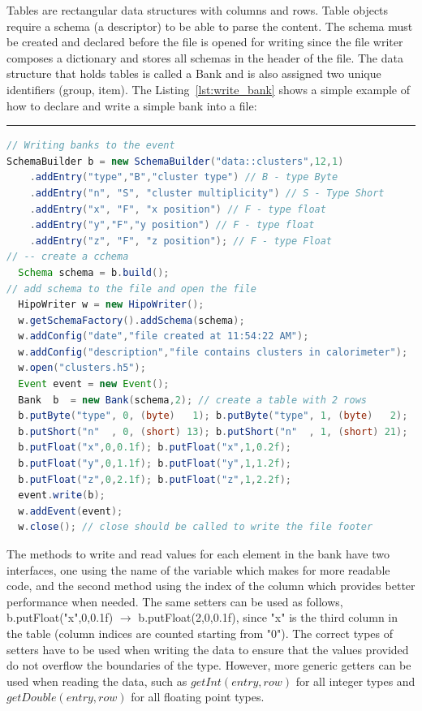 Tables are rectangular data structures with columns and rows. Table objects require a schema (a descriptor) to be able to parse the content. The schema must be created 
and declared before the file is opened for writing since the file writer composes a dictionary and stores all schemas in the header of the file. The data structure that holds
tables is called a Bank and is also assigned two unique identifiers (group, item). The Listing~\ref{lst:write_bank} shows a simple example of how to declare and write a 
simple bank into a file:
\rule{16.5cm}{0.4pt}
\begin{lstlisting}[language=java, caption=Java example to create and write banks (tables) into an event, label=lst:write_bank]
// Writing banks to the event
SchemaBuilder b = new SchemaBuilder("data::clusters",12,1)
    .addEntry("type","B","cluster type") // B - type Byte
    .addEntry("n", "S", "cluster multiplicity") // S - Type Short
    .addEntry("x", "F", "x position") // F - type float
    .addEntry("y","F","y position") // F - type float
    .addEntry("z", "F", "z position"); // F - type Float
// -- create a cchema
  Schema schema = b.build();
// add schema to the file and open the file
  HipoWriter w = new HipoWriter();
  w.getSchemaFactory().addSchema(schema);
  w.addConfig("date","file created at 11:54:22 AM");
  w.addConfig("description","file contains clusters in calorimeter");
  w.open("clusters.h5");                
  Event event = new Event();
  Bank  b  = new Bank(schema,2); // create a table with 2 rows
  b.putByte("type", 0, (byte)   1); b.putByte("type", 1, (byte)   2);
  b.putShort("n"  , 0, (short) 13); b.putShort("n"  , 1, (short) 21);
  b.putFloat("x",0,0.1f); b.putFloat("x",1,0.2f);
  b.putFloat("y",0,1.1f); b.putFloat("y",1,1.2f);
  b.putFloat("z",0,2.1f); b.putFloat("z",1,2.2f);
  event.write(b);
  w.addEvent(event);
  w.close(); // close should be called to write the file footer
\end{lstlisting}

The methods to write and read values for each element in the bank have two interfaces, one using the name of the variable
which makes for more readable code, and the second method using the index of the column which provides better performance 
when needed. The same setters can be used as follows, b.putFloat("x",0,0.1f) $\rightarrow$ b.putFloat(2,0,0.1f), since "x" is the third 
column in the table (column indices are counted starting from "0"). The correct types of setters have to be used when writing the data 
to ensure that the values provided do not overflow the boundaries of the type. However, more generic getters can be used when reading 
the data, such as $getInt(entry, row)$ for all integer types and $getDouble(entry, row)$ for all floating point types.

